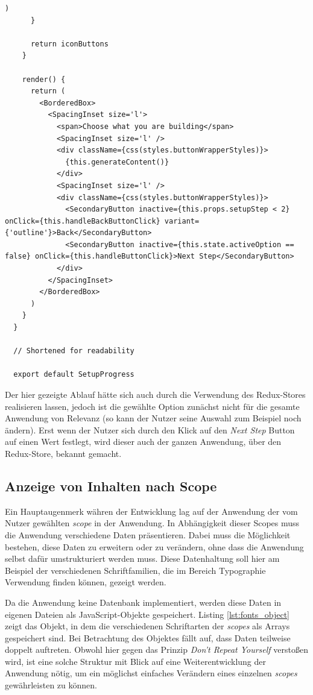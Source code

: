 \begin{lstlisting}[caption=Die Komponente \texttt{SetupProgress} in gekürzter Form, label=lst:setup]
        )
      }

      return iconButtons
    }

    render() {
      return (
        <BorderedBox>
          <SpacingInset size='l'>
            <span>Choose what you are building</span>
            <SpacingInset size='l' />
            <div className={css(styles.buttonWrapperStyles)}>
              {this.generateContent()}
            </div>
            <SpacingInset size='l' />
            <div className={css(styles.buttonWrapperStyles)}>
              <SecondaryButton inactive={this.props.setupStep < 2} onClick={this.handleBackButtonClick} variant={'outline'}>Back</SecondaryButton>
              <SecondaryButton inactive={this.state.activeOption == false} onClick={this.handleButtonClick}>Next Step</SecondaryButton>
            </div>
          </SpacingInset>
        </BorderedBox>
      )
    }
  }

  // Shortened for readability

  export default SetupProgress
\end{lstlisting}

Der hier gezeigte Ablauf hätte sich auch durch die Verwendung des Redux-Stores realisieren lassen, jedoch ist die gewählte Option zunächst nicht für die gesamte Anwendung von Relevanz (so kann der Nutzer seine Auswahl zum Beispiel noch ändern). Erst wenn der Nutzer sich durch den Klick auf den \textit{Next Step} Button auf einen Wert festlegt, wird dieser auch der ganzen Anwendung, über den Redux-Store, bekannt gemacht.

\subsection{Anzeige von Inhalten nach Scope}
\label{chap:display_scope}
Ein Hauptaugenmerk währen der Entwicklung lag auf der Anwendung der vom Nutzer gewählten \textit{scope} in der Anwendung. In Abhängigkeit dieser Scopes muss die Anwendung verschiedene Daten präsentieren. Dabei muss die Möglichkeit bestehen, diese Daten zu erweitern oder zu verändern, ohne dass die Anwendung selbst dafür umstrukturiert werden muss. Diese Datenhaltung soll hier am Beispiel der verschiedenen Schriftfamilien, die im Bereich Typographie Verwendung finden können, gezeigt werden.

Da die Anwendung keine Datenbank implementiert, werden diese Daten in eigenen Dateien als JavaScript-Objekte gespeichert. Listing \ref{lst:fonts_object} zeigt das Objekt, in dem die verschiedenen Schriftarten der \textit{scopes} als Arrays gespeichert sind. Bei Betrachtung des Objektes fällt auf, dass Daten teilweise doppelt auftreten. Obwohl hier gegen das Prinzip \textit{Don’t Repeat Yourself} verstoßen wird, ist eine solche Struktur mit Blick auf eine Weiterentwicklung der Anwendung nötig, um ein möglichst einfaches Verändern eines einzelnen \textit{scopes} gewährleisten zu können.


